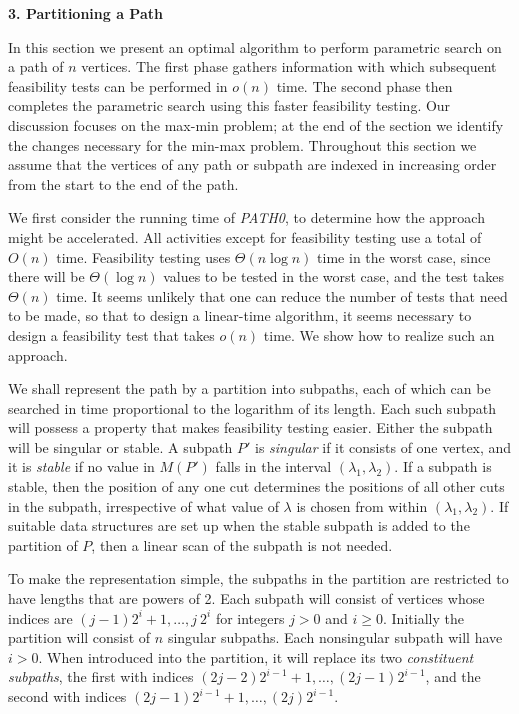 \noindent
{\bf 3. Partitioning a Path}
\medskip

In this section we present an optimal algorithm to perform
parametric search on a path of $n$ vertices.
The first phase gathers information with which subsequent feasibility tests
can be performed in $o(n)$ time.
The second phase then completes the parametric search using this
faster feasibility testing.
Our discussion focuses on the max-min problem;
at the end of the section we identify the changes necessary
for the min-max problem.
Throughout this section we assume that the vertices of any path or subpath
are indexed in increasing order from the start to the end of the path.

We first consider the running time of {\it PATH0},
to determine how the approach might be accelerated.
All activities except for feasibility testing use a total of $O(n)$ time.
Feasibility testing uses $\Theta (n \log n)$ time in the worst case,
since there will be $\Theta (\log n)$ values to be tested in the worst case,
and the test takes $\Theta (n)$ time.
It seems unlikely that one can reduce the number of tests that need to be made,
so that to design a linear-time algorithm,
it seems necessary to design a feasibility test that takes $o(n)$ time.
We show how to realize such an approach.

We shall represent the path by a partition into subpaths,
each of which can be searched in time proportional to the
logarithm of its length.
Each such subpath will possess a property
that makes feasibility testing easier.
Either the subpath will be singular or stable.
A subpath $P'$ is {\it singular} if it consists of one vertex,
and it is {\it stable} if no value in $M(P')$ falls in the interval
$(\lambda_1, \lambda_2 )$.
If a subpath is stable,
then the position of any one cut determines the positions
of all other cuts in the subpath,
irrespective of what value of $\lambda$ is chosen from within
$(\lambda_1, \lambda_2 )$.
If suitable data structures are set up when the stable subpath
is added to the partition of $P$,
then a linear scan of the subpath is not needed.

To make the representation simple,
the subpaths in the partition are restricted to have lengths
that are powers of 2.
Each subpath will consist of vertices whose indices are
$(j-1)2^i+1, \ldots ,j\:2^i$ for integers $j>0$ and $i \geq 0$.
Initially the partition will consist of $n$ singular subpaths.
Each nonsingular subpath will have $i>0$.
When introduced into the partition,
it will replace its two {\it constituent subpaths},
the first with indices $(2j-2)2^{i-1}+1, \ldots ,(2j-1)2^{i-1}$,
and the second with indices $(2j-1)2^{i-1}+1, \ldots ,(2j)2^{i-1}$.

